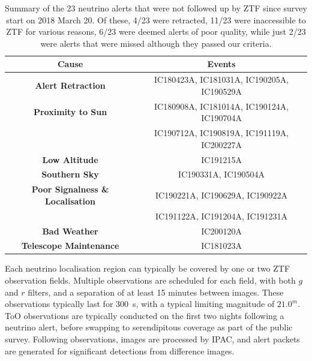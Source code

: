 \documentclass{nature_plusfigure}
\begin{document}
\begin{methods}
\begin{table}
\centering
	\begin{tabular}{||c c ||} 
		\hline
		\textbf{Cause} & \textbf{Events} \\
		\hline
		\textbf{Alert Retraction} & IC180423A\cite{IC180423A}, IC181031A\cite{IC181031A}, IC190205A\cite{IC190205A}, IC190529A\cite{IC190529A}\\
		\hline
		\textbf{Proximity to Sun} &IC180908A\cite{IC180908A}, IC181014A\cite{IC181014A}, IC190124A\cite{IC190124A}, IC190704A\cite{IC190704A}\\
		& IC190712A\cite{IC190712A}, IC190819A\cite{IC190819A}, IC191119A\cite{IC191119A}, IC200227A\cite{IC200227A}\\
		\textbf{Low Altitude} & IC191215A\cite{IC191215A}\\
		\textbf{Southern Sky} & IC190331A\cite{IC190331A}, IC190504A\cite{IC190504A}\\
		\hline
		\textbf{Poor Signalness \& Localisation} &
		IC190221A\cite{IC190221A}, IC190629A\cite{IC190629A}, IC190922A\cite{IC190922A}\\
		& IC191122A\cite{IC191122A}, IC191204A\cite{IC191204A}, IC191231A\cite{IC191231A}\\
		\hline
		\textbf{Bad Weather} & IC200120A\cite{IC200120A,IC200120A_2}\\
		\textbf{Telescope Maintenance} & IC181023A\cite{IC181023A}\\
		\hline
	\end{tabular}
	\caption{Summary of the 23 neutrino alerts that were not followed up by ZTF since survey start on 2018 March 20. Of these, 4/23 were retracted, 11/23 were inaccessible to ZTF for various reasons, 6/23 were deemed alerts of poor quality, while just 2/23 were alerts that were missed although they passed our criteria.}
	\label{tab:nu_non_observed}
\end{table}

Each neutrino localisation region can typically be covered by one or two ZTF observation fields. Multiple observations are scheduled for each field, with both $g$ and $r$ filters, and a separation of at least 15 minutes between images. These observations typically last for 300~s, with a typical limiting magnitude of $21.0^{m}$.  ToO observations are typically conducted on the first two nights following a neutrino alert, before swapping to serendipitous coverage as part of the public survey. Following observations, images are processed by IPAC\cite{2019PASP..131a8003M}, and alert packets are generated for significant detections from difference images\cite{2019PASP..131a8001P}.


\end{methods}
\end{document}
